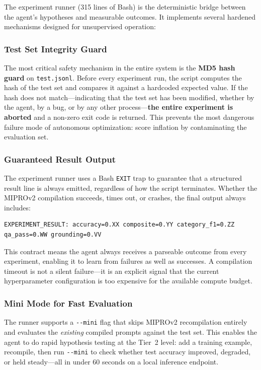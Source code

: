 \documentclass[11pt]{article}
\begin{document}
The experiment runner (315 lines of Bash) is the deterministic bridge
between the agent's hypotheses and measurable outcomes. It implements
several hardened mechanisms designed for unsupervised operation:

\subsubsection{Test Set Integrity Guard}
\label{sec:testguard}

The most critical safety mechanism in the entire system is the
\textbf{MD5 hash guard} on \texttt{test.jsonl}. Before every experiment
run, the script computes the hash of the test set and compares it against
a hardcoded expected value. If the hash does not match---indicating that
the test set has been modified, whether by the agent, by a bug, or by
any other process---\textbf{the entire experiment is aborted} and a
non-zero exit code is returned. This prevents the most dangerous failure
mode of autonomous optimization: score inflation by contaminating the
evaluation set.

\subsubsection{Guaranteed Result Output}

The experiment runner uses a Bash \texttt{EXIT} trap to guarantee that a
structured result line is always emitted, regardless of how the script
terminates. Whether the MIPROv2 compilation succeeds, times out, or
crashes, the final output always includes:

\begin{verbatim}
EXPERIMENT_RESULT: accuracy=0.XX composite=0.YY category_f1=0.ZZ qa_pass=0.WW grounding=0.VV
\end{verbatim}

This contract means the agent always receives a parseable outcome from
every experiment, enabling it to learn from failures as well as successes.
A compilation timeout is not a silent failure---it is an explicit signal
that the current hyperparameter configuration is too expensive for the
available compute budget.

\subsubsection{Mini Mode for Fast Evaluation}

The runner supports a \texttt{-{}-mini} flag that skips MIPROv2
recompilation entirely and evaluates the \emph{existing} compiled
prompts against the test set. This enables the agent to do rapid
hypothesis testing at the Tier~2 level: add a training example,
recompile, then run \texttt{-{}-mini} to check whether test accuracy
improved, degraded, or held steady---all in under 60 seconds on a
local inference endpoint.
\end{document}
